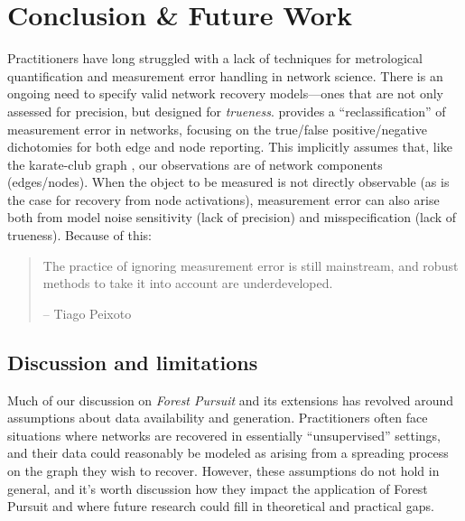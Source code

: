 \documentclass[%
	12pt,
		oneside,
		letterpaper
]{book}
\begin{document}

\chapter{Conclusion \& Future Work}\label{sec-conclusion}

Practitioners have long struggled with a lack of techniques for metrological quantification and measurement error handling in network science.
There is an ongoing need to specify valid network recovery models---ones that are not only assessed for precision, but designed for \emph{trueness}.
\textcite{Measurementerrornetwork_Wang2012} provides a ``reclassification'' of measurement error in networks, focusing on the true/false positive/negative dichotomies for both edge and node reporting.
This implicitly assumes that, like the karate-club graph \autocite{InformationFlowModel_Zachary1977}, our observations are of network components (edges/nodes).
When the object to be measured is not directly observable (as is the case for recovery from node activations), measurement error can also arise both from model noise sensitivity (lack of precision) and misspecification (lack of trueness).
Because of this:

\singlespacing

\begin{quote}
The practice of ignoring measurement error is still mainstream, and robust methods to take it into account are underdeveloped.

\hfill -- Tiago Peixoto \autocite{ReconstructingNetworksUnknown_Peixoto2018}
\end{quote}

\doublespacing

\section{Discussion and limitations}\label{discussion-and-limitations}

Much of our discussion on \emph{Forest Pursuit} and its extensions has revolved around assumptions about data availability and generation.
Practitioners often face situations where networks are recovered in essentially ``unsupervised'' settings, and their data could reasonably be modeled as arising from a spreading process on the graph they wish to recover.
However, these assumptions do not hold in general, and it's worth discussion how they impact the application of Forest Pursuit and where future research could fill in theoretical and practical gaps.
\end{document}
